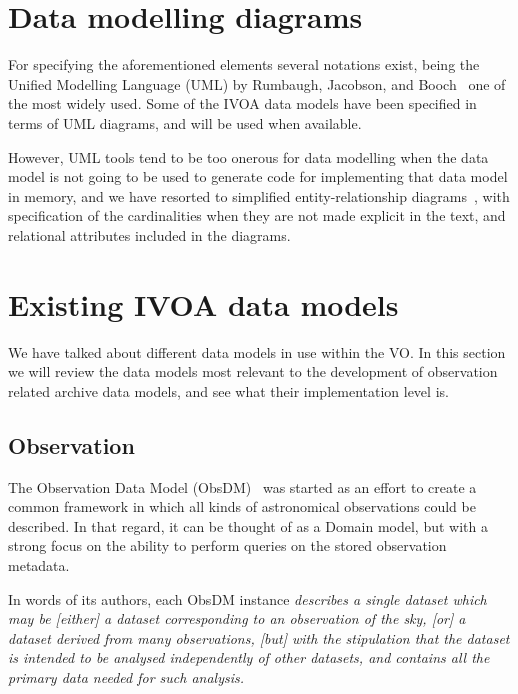 	
	\section{Data modelling diagrams} %
	\label{sec:data_modelling_diagrams}
	
		For specifying the aforementioned elements several
		notations exist, being the Unified Modelling
		Language (UML) by Rumbaugh,
		Jacobson, and Booch~\cite{Rumbaugh:1998:UMLRG} one of
		the most widely used. Some of the IVOA data models have
		been specified in terms of UML diagrams, and will be used
		when available.
		
		However, UML tools tend to be too onerous for data
		modelling when the data model is not going to be used to
		generate code for implementing that data model in memory,
		and we have resorted to simplified entity-relationship
		diagrams~\cite{1976atds....1....9C}, with specification of
		the cardinalities when they are not made explicit in the
		text, and relational attributes included in the diagrams.
	
	
	\section{Existing IVOA data models} %
	\label{sec:existing_ivoa_data_models}
	
		We have talked about different data models in use within
		the VO. In this section we will review the data models most
		relevant to the development of observation related archive
		data models, and see what their implementation level is.
	
		\subsection{Observation} %
		\label{sec:the_ivoa_observation_model}
	
			The Observation Data Model 
			(ObsDM)~\cite{2005dmo..rept.....M}
			was started as an
			effort to create a common framework in which all kinds
			of astronomical observations could be described. In
			that regard, it can be thought of as a Domain model,
			but with a strong focus on the ability to perform
			queries on the stored observation metadata.
			
			 In words of its authors, each ObsDM instance
			\emph{describes a single dataset which may be [either]
			a dataset corresponding to an observation of the sky,
			[or] a dataset derived from many observations, [but]
			with the stipulation that the dataset is intended to
			be analysed independently of other datasets, and contains
			all the primary data needed for such analysis.}
			
